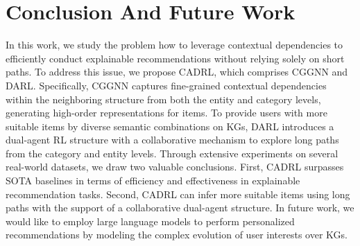 \documentclass[conference]{IEEEtran}
\begin{document}
\section{Conclusion And Future Work}
In this work, we study the problem how to leverage contextual dependencies to  efficiently conduct explainable recommendations without relying solely on short paths. To address this issue, we propose CADRL, which comprises CGGNN and DARL. Specifically, CGGNN captures fine-grained contextual dependencies within the neighboring structure from both the entity and category levels, generating high-order representations for items. To provide users with more suitable items by diverse semantic combinations on KGs, DARL introduces a dual-agent RL structure with a collaborative mechanism to explore long paths from the category and entity levels. Through extensive experiments on several real-world datasets, we draw two valuable conclusions. First, CADRL surpasses SOTA baselines in terms of efficiency and effectiveness in explainable recommendation tasks. Second, CADRL can infer more suitable items using long paths with the support of a collaborative dual-agent structure. In future work, we would like to employ large language models to perform personalized recommendations by modeling the complex evolution of user interests over KGs. %




\newpage 

\end{document}
